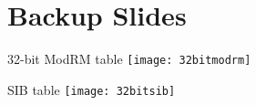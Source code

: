 \section{Backup Slides}

\begin{frame}{32-bit ModRM table}
\texttt{[image: 32bitmodrm]}
\end{frame}

\begin{frame}{SIB table}
\texttt{[image: 32bitsib]}
\end{frame}
